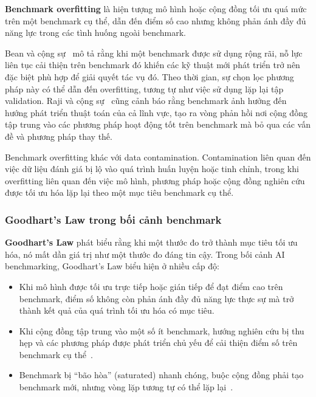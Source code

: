 \textbf{Benchmark overfitting} là hiện tượng mô hình hoặc cộng đồng tối ưu quá mức trên một benchmark cụ thể, dẫn đến điểm số cao nhưng không phản ánh đầy đủ năng lực trong các tình huống ngoài benchmark.

Bean và cộng sự~\cite{measuring_what_matters} mô tả rằng khi một benchmark được sử dụng rộng rãi, nỗ lực liên tục cải thiện trên benchmark đó khiến các kỹ thuật mới phát triển trở nên đặc biệt phù hợp để giải quyết tác vụ đó. Theo thời gian, sự chọn lọc phương pháp này có thể dẫn đến overfitting, tương tự như việc sử dụng lặp lại tập validation. Raji và cộng sự~\cite{everything_benchmark} cũng cảnh báo rằng benchmark ảnh hưởng đến hướng phát triển thuật toán của cả lĩnh vực, tạo ra vòng phản hồi nơi cộng đồng tập trung vào các phương pháp hoạt động tốt trên benchmark mà bỏ qua các vấn đề và phương pháp thay thế.

Benchmark overfitting khác với data contamination. Contamination liên quan đến việc dữ liệu đánh giá bị lộ vào quá trình huấn luyện hoặc tinh chỉnh, trong khi overfitting liên quan đến việc mô hình, phương pháp hoặc cộng đồng nghiên cứu được tối ưu hóa lặp lại theo một mục tiêu benchmark cụ thể.

\subsubsection{Goodhart's Law trong bối cảnh benchmark}
\label{sec:goodharts_law}

\textbf{Goodhart's Law} phát biểu rằng khi một thước đo trở thành mục tiêu tối ưu hóa, nó mất dần giá trị như một thước đo đáng tin cậy. Trong bối cảnh AI benchmarking, Goodhart's Law biểu hiện ở nhiều cấp độ:

\begin{itemize}
    \item Khi mô hình được tối ưu trực tiếp hoặc gián tiếp để đạt điểm cao trên benchmark, điểm số không còn phản ánh đầy đủ năng lực thực sự mà trở thành kết quả của quá trình tối ưu hóa có mục tiêu.
    \item Khi cộng đồng tập trung vào một số ít benchmark, hướng nghiên cứu bị thu hẹp và các phương pháp được phát triển chủ yếu để cải thiện điểm số trên benchmark cụ thể~\cite{everything_benchmark}.
    \item Benchmark bị ``bão hòa'' (saturated) nhanh chóng, buộc cộng đồng phải tạo benchmark mới, nhưng vòng lặp tương tự có thể lặp lại~\cite{measuring_what_matters}.
\end{itemize}


